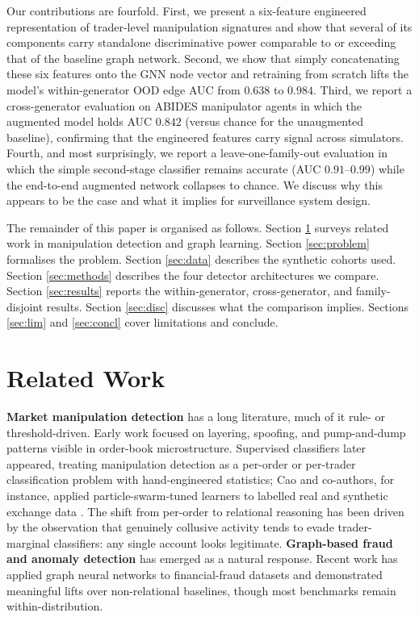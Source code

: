 \documentclass[10pt,twocolumn,letterpaper]{article}
\begin{document}
Our contributions are fourfold. First, we present a six-feature
engineered representation of trader-level manipulation signatures and
show that several of its components carry standalone discriminative
power comparable to or exceeding that of the baseline graph network.
Second, we show that simply concatenating these six features onto the
GNN node vector and retraining from scratch lifts the model's
within-generator OOD edge AUC from \(0.638\) to \(0.984\). Third, we
report a cross-generator evaluation on ABIDES manipulator agents in
which the augmented model holds AUC \(0.842\) (versus chance for the
unaugmented baseline), confirming that the engineered features carry
signal across simulators. Fourth, and most surprisingly, we report a
leave-one-family-out evaluation in which the simple second-stage
classifier remains accurate (AUC \(0.91\)--\(0.99\)) while the
end-to-end augmented network collapses to chance. We discuss why this
appears to be the case and what it implies for surveillance system
design.

The remainder of this paper is organised as follows. Section
\ref{sec:related} surveys related work in manipulation detection and
graph learning. Section \ref{sec:problem} formalises the problem.
Section \ref{sec:data} describes the synthetic cohorts used. Section
\ref{sec:methods} describes the four detector architectures we
compare. Section \ref{sec:results} reports the within-generator,
cross-generator, and family-disjoint results. Section \ref{sec:disc}
discusses what the comparison implies. Sections \ref{sec:lim} and
\ref{sec:concl} cover limitations and conclude.

\section{Related Work}
\label{sec:related}

\textbf{Market manipulation detection} has a long literature, much of
it rule- or threshold-driven. Early work focused on layering, spoofing,
and pump-and-dump patterns visible in order-book microstructure.
Supervised classifiers later appeared,
treating manipulation detection as a per-order or per-trader
classification problem with hand-engineered statistics; Cao and
co-authors, for instance, applied particle-swarm-tuned learners to
labelled real and synthetic exchange data \cite{cao2014pso}. The shift
from per-order to relational reasoning has been driven by the
observation that genuinely collusive activity tends to evade
trader-marginal classifiers: any single account looks legitimate.
\textbf{Graph-based fraud and anomaly detection} has emerged as a
natural response. Recent work has applied graph neural networks to
financial-fraud datasets and demonstrated meaningful lifts over
non-relational baselines, though most
benchmarks remain within-distribution.
\end{document}
